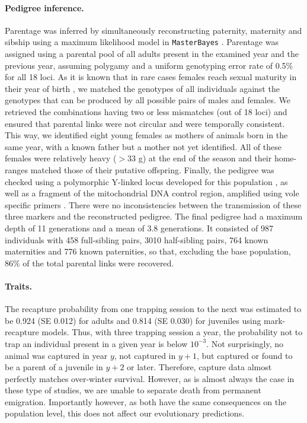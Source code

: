\paragraph{Pedigree inference.}
Parentage was inferred by simultaneously reconstructing paternity, maternity and sibship using a maximum likelihood model in \verb+MasterBayes+ \parencite{Hadfield2006}. Parentage was assigned using a parental pool of all adults present in the examined year and the previous year, assuming polygamy and a uniform genotyping error rate of 0.5\% for all 18 loci. As it is known that in rare cases females reach sexual maturity in their year of birth \parencite{Janeau1997}, we matched the genotypes of all individuals against the genotypes that can be produced by all possible pairs of males and females. We retrieved the combinations having two or less mismatches (out of 18 loci) and ensured that parental links were not circular and were temporally consistent. This way, we identified eight young females as mothers of animals born in the same year, with a known father but a mother not yet identified. All of these females were relatively heavy ($>$33 g) at the end of the season and their home-ranges matched those of their putative offspring.
Finally, the pedigree was checked using a polymorphic Y-linked locus developed for this population \parencite{Wandeler2011}, as well as a fragment of the mitochondrial DNA control region, amplified using vole specific primers \parencite{Haring2000}. There were no inconsistencies between the transmission of these three markers and the reconstructed pedigree.
The final pedigree had a maximum depth of 11 generations and a mean of 3.8 generations. It consisted of 987 individuals with 458 full-sibling pairs, 3010 half-sibling pairs, 764 known maternities and 776 known paternities, so that, excluding the base population, 86\% of the total parental links were recovered.

\paragraph{Traits.}
The recapture probability from one trapping session to the next was estimated to be 0.924 (SE 0.012) for adults and 0.814 (SE 0.030) for juveniles using mark-recapture models. Thus, with three trapping session a year, the probability not to trap an individual present in a given year is below $10^{-3}$. Not surprisingly, no animal was captured in year $y$, not captured in $y+1$, but captured or found to be a parent of a juvenile in $y+2$ or later. Therefore, capture data almost perfectly matches over-winter survival. However, as is almost always the case in these type of studies, we are unable to separate death from permanent emigration. Importantly however, as both have the same consequences on the population level, this does not affect our evolutionary predictions.

